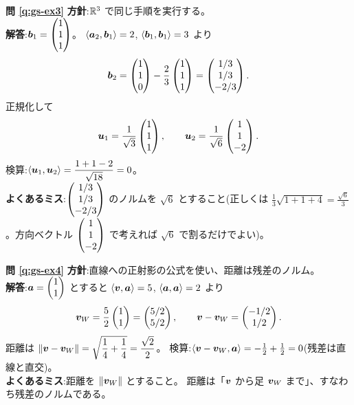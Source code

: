 \bigskip
\noindent\textbf{問 \ref{q:gs-ex3}}\quad
\textbf{方針}:$\mathbb{R}^3$ で同じ手順を実行する。\\
\textbf{解答}:$\bm{b}_1 = \begin{pmatrix}1 \\ 1 \\ 1\end{pmatrix}$。
$\langle \bm{a}_2, \bm{b}_1 \rangle = 2$,
$\langle \bm{b}_1, \bm{b}_1 \rangle = 3$ より
\[
\bm{b}_2 = \begin{pmatrix}1 \\ 1 \\ 0\end{pmatrix} - \frac{2}{3}\begin{pmatrix}1 \\ 1 \\ 1\end{pmatrix}
= \begin{pmatrix}1/3 \\ 1/3 \\ -2/3\end{pmatrix}.
\]
正規化して
\[
\bm{u}_1 = \frac{1}{\sqrt{3}}\begin{pmatrix}1 \\ 1 \\ 1\end{pmatrix}, \qquad
\bm{u}_2 = \frac{1}{\sqrt{6}}\begin{pmatrix}1 \\ 1 \\ -2\end{pmatrix}.
\]
検算:$\langle \bm{u}_1, \bm{u}_2 \rangle
= \dfrac{1 + 1 - 2}{\sqrt{18}} = 0$。\\
\textbf{よくあるミス}:$\begin{pmatrix}1/3 \\ 1/3 \\ -2/3\end{pmatrix}$ のノルムを
$\sqrt{6}$ とすること(正しくは $\frac{1}{3}\sqrt{1 + 1 + 4}
= \frac{\sqrt{6}}{3}$。方向ベクトル $\begin{pmatrix}1\\1\\-2\end{pmatrix}$ で考えれば
$\sqrt{6}$ で割るだけでよい)。

\bigskip
\noindent\textbf{問 \ref{q:gs-ex4}}\quad
\textbf{方針}:直線への正射影の公式を使い、距離は残差のノルム。\\
\textbf{解答}:$\bm{a} = \begin{pmatrix}1 \\ 1\end{pmatrix}$ とすると
$\langle \bm{v}, \bm{a} \rangle = 5$,
$\langle \bm{a}, \bm{a} \rangle = 2$ より
\[
\bm{v}_W = \frac{5}{2}\begin{pmatrix}1 \\ 1\end{pmatrix} = \begin{pmatrix}5/2 \\ 5/2\end{pmatrix}, \qquad
\bm{v} - \bm{v}_W = \begin{pmatrix}-1/2 \\ 1/2\end{pmatrix}.
\]
距離は $\|\bm{v} - \bm{v}_W\| = \sqrt{\dfrac{1}{4} + \dfrac{1}{4}}
= \dfrac{\sqrt{2}}{2}$。
検算:$\langle \bm{v} - \bm{v}_W, \bm{a} \rangle
= -\frac{1}{2} + \frac{1}{2} = 0$(残差は直線と直交)。\\
\textbf{よくあるミス}:距離を $\|\bm{v}_W\|$ とすること。
距離は「$\bm{v}$ から足 $\bm{v}_W$ まで」、すなわち残差のノルムである。

